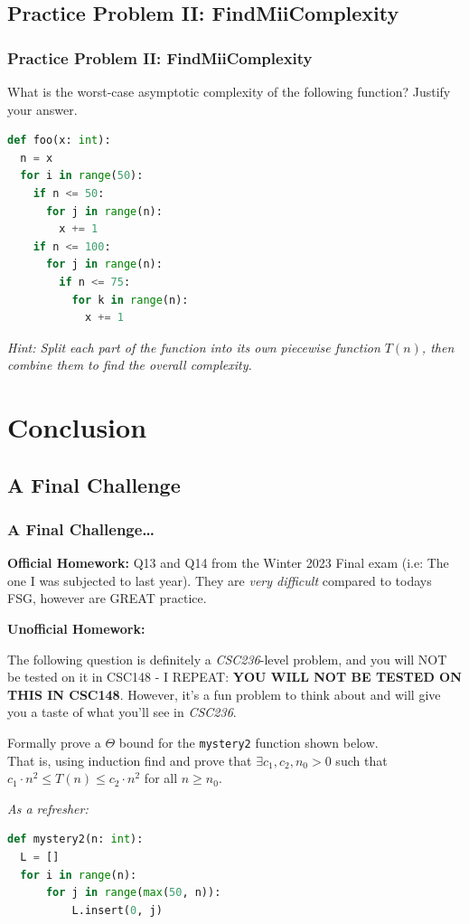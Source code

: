 \documentclass[hyperref={colorlinks,citecolor=blue,linkcolor=blue,urlcolor=blue}, aspectratio=1610]{beamer}
\begin{document}
\subsection{Practice Problem II: FindMiiComplexity}
\begin{frame}[fragile]
  \frametitle{Practice Problem II: FindMiiComplexity}
  What is the worst-case asymptotic complexity of the following function? Justify your answer.
  \begin{lstlisting}[language=Python,style=mystyle]
def foo(x: int):
  n = x
  for i in range(50):
    if n <= 50:
      for j in range(n):
        x += 1
    if n <= 100:
      for j in range(n):
        if n <= 75:
          for k in range(n):
            x += 1
  \end{lstlisting}
  \textit{Hint: Split each part of the function into its own piecewise function $T(n)$, then combine them to find the overall complexity.}\\
\end{frame}

\section{Conclusion}

\subsection{A Final Challenge}
\begin{frame}[fragile]
  \frametitle{A Final Challenge\ldots}

  \textbf{Official Homework:} Q13 and Q14 from the Winter 2023 Final exam (i.e: The one I was subjected to last year). They are \textit{very difficult} compared to todays FSG, however are GREAT practice.
  
  \textbf{Unofficial Homework:}
  
  The following question is definitely a \textit{CSC236}-level problem, and you will NOT be tested on it in CSC148 - I REPEAT: \textbf{YOU WILL NOT BE TESTED ON THIS IN CSC148}. However, it's a fun problem to think about and will give you a taste of what you'll see in \textit{CSC236}.

  Formally prove a $\Theta$ bound for the \texttt{mystery2} function shown below. \\

  That is, using induction find and prove that $\exists c_1, c_2, n_0 > 0$ such that $c_1 \cdot n^2 \leq T(n) \leq c_2 \cdot n^2$ for all $n \geq n_0$.
   
  \textit{As a refresher:}
  \begin{lstlisting}[language=Python,style=mystyle]
def mystery2(n: int):
  L = []
  for i in range(n):
      for j in range(max(50, n)):
          L.insert(0, j)
  \end{lstlisting}
\end{frame}
\end{document}
